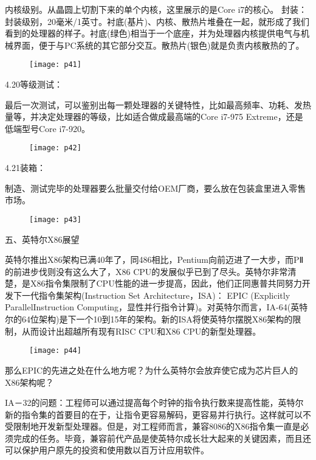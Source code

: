\documentclass[utf8]{book}
\begin{document}
	内核级别。从晶圆上切割下来的单个内核，这里展示的是Core i7的核心。
	封装：
	封装级别，20毫米/1英寸。衬底(基片)、内核、散热片堆叠在一起，就形成了我们看到的处理器的样子。衬底(绿色)相当于一个底座，并为处理器内核提供电气与机械界面，便于与PC系统的其它部分交互。散热片(银色)就是负责内核散热的了。
	\begin{figure}[H]
		\centering
		\texttt{[image: p41]}
	\end{figure}
	4.20等级测试：
	
	最后一次测试，可以鉴别出每一颗处理器的关键特性，比如最高频率、功耗、发热量等，并决定处理器的等级，比如适合做成最高端的Core i7-975 Extreme，还是低端型号Core i7-920。
	\begin{figure}[H]
		\centering
		\texttt{[image: p42]}
	\end{figure}
	4.21装箱：
	
	
	制造、测试完毕的处理器要么批量交付给OEM厂商，要么放在包装盒里进入零售市场。
	\begin{figure}[H]
		\centering
		\texttt{[image: p43]}
	\end{figure}
	五、英特尔X86展望
	
	英特尔推出X86架构已满40年了，同486相比，Pentium向前迈进了一大步，而PⅡ的前进步伐则没有这么大了，X86 CPU的发展似乎已到了尽头。英特尔非常清楚，是X86指令集限制了CPU性能的进一步提高，因此，他们正同惠普共同努力开发下一代指令集架构(Instruction Set Architecture，ISA)： EPIC (Explicitly ParallelInstruction Computing，显性并行指令计算)。对英特尔而言，IA-64(英特尔的64位架构)是下一个10到15年的架构。新的ISA将使英特尔摆脱X86架构的限制，从而设计出超越所有现有RISC CPU和X86 CPU的新型处理器。
	
	\begin{figure}[H]
		\centering
		\texttt{[image: p44]}
	\end{figure}
	那么EPIC的先进之处在什么地方呢？为什么英特尔会放弃使它成为芯片巨人的X86架构呢？
	
	IA－32的问题：工程师可以通过提高每个时钟的指令执行数来提高性能，英特尔新的指令集的首要目的在于，让指令更容易解码，更容易并行执行。这样就可以不受限制地开发新型处理器。但是，对工程师而言，兼容8086的X86指令集一直是必须完成的任务。毕竟，兼容前代产品是使英特尔成长壮大起来的关键因素，而且还可以保护用户原先的投资和使用数以百万计应用软件。
	
\end{document}
